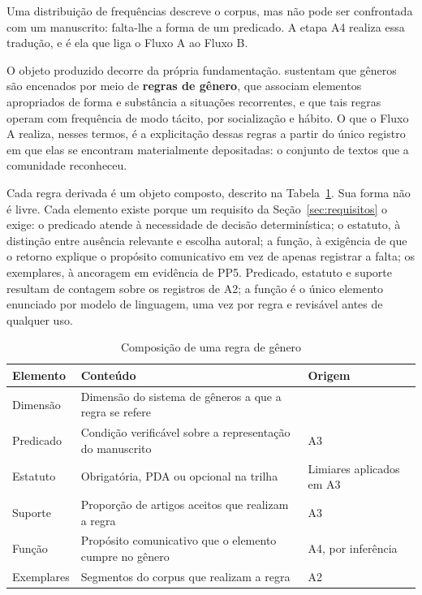 Uma distribuição de frequências descreve o corpus, mas não pode ser confrontada com um manuscrito: falta-lhe a forma de um predicado. A etapa A4 realiza essa tradução, e é ela que liga o Fluxo A ao Fluxo B.

O objeto produzido decorre da própria fundamentação.  sustentam que gêneros são encenados por meio de \textbf{regras de gênero}, que associam elementos apropriados de forma e substância a situações recorrentes, e que tais regras operam com frequência de modo tácito, por socialização e hábito. O que o Fluxo A realiza, nesses termos, é a explicitação dessas regras a partir do único registro em que elas se encontram materialmente depositadas: o conjunto de textos que a comunidade reconheceu.

Cada regra derivada é um objeto composto, descrito na Tabela~\ref{tab:regra}. Sua forma não é livre. Cada elemento existe porque um requisito da Seção~\ref{sec:requisitos} o exige: o predicado atende à necessidade de decisão determinística; o estatuto, à distinção entre ausência relevante e escolha autoral; a função, à exigência de que o retorno explique o propósito comunicativo em vez de apenas registrar a falta; os exemplares, à ancoragem em evidência de PP5. Predicado, estatuto e suporte resultam de contagem sobre os registros de A2; a função é o único elemento enunciado por modelo de linguagem, uma vez por regra e revisável antes de qualquer uso.

\begin{table}[H]
\centering
\caption{Composição de uma regra de gênero}
\label{tab:regra}
\small
\begin{tabular}{|p{2.6cm}|p{7.2cm}|p{3.4cm}|}
\hline
\textbf{Elemento} & \textbf{Conteúdo} & \textbf{Origem} \\
\hline
Dimensão & Dimensão do sistema de gêneros a que a regra se refere & \cite{GenreSystems} \\
\hline
Predicado & Condição verificável sobre a representação do manuscrito & A3 \\
\hline
Estatuto & Obrigatória, PDA ou opcional na trilha & Limiares aplicados em A3 \\
\hline
Suporte & Proporção de artigos aceitos que realizam a regra & A3 \\
\hline
Função & Propósito comunicativo que o elemento cumpre no gênero & A4, por inferência \\
\hline
Exemplares & Segmentos do corpus que realizam a regra & A2 \\
\hline
\end{tabular}
\end{table}


